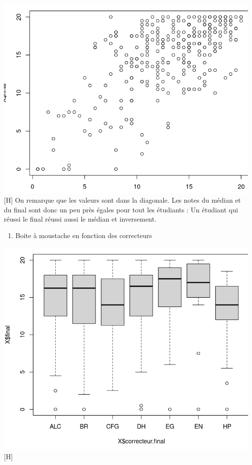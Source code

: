 \documentclass[
]{article}
\newenvironment{Shaded}{}{}
\newcommand{\CommentTok}[1]{\textcolor[rgb]{0.38,0.63,0.69}{\textit{#1}}}
\newcommand{\KeywordTok}[1]{\textcolor[rgb]{0.00,0.44,0.13}{\textbf{#1}}}
\newcommand{\NormalTok}[1]{#1}
\newcommand{\OperatorTok}[1]{\textcolor[rgb]{0.40,0.40,0.40}{#1}}
\newcommand{\StringTok}[1]{\textcolor[rgb]{0.25,0.44,0.63}{#1}}
\providecommand{\tightlist}{%
  \setlength{\itemsep}{0pt}\setlength{\parskip}{0pt}}
\begin{document}
\includegraphics{img/plot.png}[H] 
On remarque que les valeurs sont dans la
diagonale. Les notes du médian et du final 
sont donc un peu près égales pour tout les 
étudiants : Un étudiant qui réussi le final 
réussi aussi le médian et inversement.

\begin{enumerate}
\def\labelenumi{\arabic{enumi}.}
\setcounter{enumi}{29}
\tightlist
\item
  Boite à moustache en fonction des correcteurs
\end{enumerate}

\begin{Shaded}
\end{Shaded}

\includegraphics{img/boxplot(double).png}[H]
\end{document}
